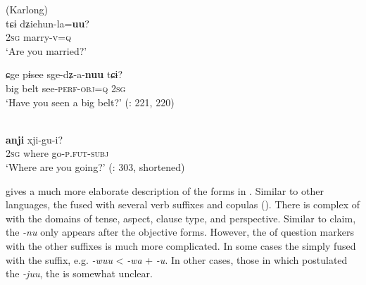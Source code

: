 \ea%
    \label{ex:mong:53}
     (Karlong)\\
    \ea
    \gll tɕɨ  dʑiehun-la=\textbf{{uu}}?\\
    2\textsc{sg}  marry-\textsc{v=q}\\
    \glt ‘Are you married?’
    
    \ex
    \gll ɕge  pɨsee  sge-dʑ-a-\textbf{{nuu}} {tɕɨ?}\\
    big  belt  see-\textsc{perf}-\textsc{obj=q}  2\textsc{sg}\\
    \glt ‘Have you seen a big belt?’ (\citealt{Faehndrich2007}: 221, 220)
    \z
    \z

\ea%
    \label{ex:mong:54}
    \\
     \textbf{{anji}} {xji}-{gu-i?}\\
    2\textsc{sg}  where  go-\textsc{p}.\textsc{fut}-\textsc{subj}\\
    \glt ‘Where are you going?’ (\citealt{Georg2003b}: 303, shortened)
    \z

\citet{Åkerman2012} gives a much more elaborate description of the  forms in . Similar to other  languages, the  fused with several verb suffixes and copulas (). There is complex  of  with the domains of tense, aspect, clause type, and perspective. Similar to  claim, the  \textit{-nu} only appears after the objective forms. However, the  of question markers with the other suffixes is much more complicated. In some cases the  simply fused with the suffix, e.g. \textit{-wuu} < \textit{-wa} + \textit{-u}. In other cases, those in which \citet{Faehndrich2007} postulated the  \textit{-juu}, the  is somewhat unclear.

